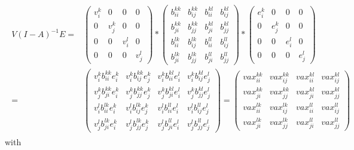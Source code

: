 \documentclass{article}
\begin{document}
\begin{align}
\begin{split}
V (I-A)^{-1}E=&
\begin{pmatrix}
v_{i}^{k}& 0& 0& 0\\
0& v_{j}^{k}& 0& 0\\
0& 0& v_{i}^{l}& 0\\
0& 0& 0& v_{j}^{l}
\end{pmatrix}
*
\begin{pmatrix}
b_{ii}^{kk}& b_{ij}^{kk}& b_{ii}^{kl}& b_{ij}^{kl}\\
b_{ji}^{kk}& b_{jj}^{kk}& b_{ji}^{kl}& b_{jj}^{kl}\\
b_{ii}^{lk}& b_{ij}^{lk}& b_{ii}^{ll}& b_{ij}^{ll}\\
b_{ji}^{lk}& b_{jj}^{lk}& b_{ji}^{ll}& b_{jj}^{ll}
\end{pmatrix}
*
\begin{pmatrix}
e_{i}^{k}& 0& 0& 0\\
0& e_{j}^{k}& 0& 0\\
0& 0& e_{i}^{l}& 0\\
0& 0& 0& e_{j}^{l}
\end{pmatrix}
 \\
=& 
\begin{pmatrix}
v_{i}^{k}b_{ii}^{kk}e_{i}^{k}& v_{i}^{k} b_{ij}^{kk}e_{j}^{k}& v_{i}^{k}b_{ii}^{kl}e_{i}^{l}& v_{i}^{k}b_{ij}^{kl}e_{j}^{l}\\
v_{j}^{k}b_{ji}^{kk}e_{i}^{k}& v_{j}^{k}b_{jj}^{kk}e_{j}^{k}& v_{j}^{k}b_{ji}^{kl}e_{i}^{l}& v_{j}^{k}b_{jj}^{kl}e_{j}^{l}\\
v_{i}^{l}b_{ii}^{lk}e_{i}^{k}& v_{i}^{l}b_{ij}^{lk}e_{j}^{k}& v_{i}^{l}b_{ii}^{ll}e_{i}^{l}& v_{i}^{l}b_{ij}^{ll}e_{j}^{l}\\
v_{j}^{l}b_{ji}^{lk}e_{i}^{k}& v_{j}^{l}b_{jj}^{lk}e_{j}^{k}& v_{j}^{l}b_{ji}^{ll}e_{i}^{l}& v_{j}^{l}b_{jj}^{ll}e_{j}^{l}
\end{pmatrix}
=
\begin{pmatrix}
vax_{ii}^{kk}& vax_{ij}^{kk}& vax_{ii}^{kl}& vax_{ij}^{kl}\\
vax_{ji}^{kk}& vax_{jj}^{kk}& vax_{ji}^{kl}& vax_{jj}^{kl}\\
vax_{ii}^{lk}& vax_{ij}^{lk}& vax_{ii}^{ll}& vax_{ij}^{ll}\\
vax_{ji}^{lk}& vax_{jj}^{lk}& vax_{ji}^{ll}& vax_{jj}^{ll}
\end{pmatrix}
\end{split}
\end{align}
with
\end{document}
